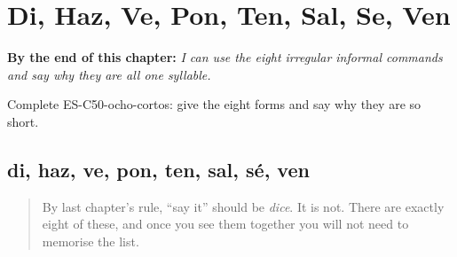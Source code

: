 
\chapter{Di, Haz, Ve, Pon, Ten, Sal, Se, Ven}
\label{ch:command-irregular}

\begin{chapteropening}
\textbf{By the end of this chapter:} \emph{I can use the eight irregular informal commands and say why they are all one syllable.}

Complete ES-C50-ocho-cortos: give the eight forms and say why they are so short.
\end{chapteropening}

\section[di · haz · ve · pon · ten · sal · sé …]{di, haz, ve, pon, ten, sal, sé, ven}

\label{lesson:ES-C50-ocho-cortos}



\begin{quote}
By last chapter's rule, \textquotedblleft{}say it\textquotedblright{} should be \emph{dice}. It is not. There are exactly eight of these, and once you see them together you will not need to memorise the list.
\end{quote}

